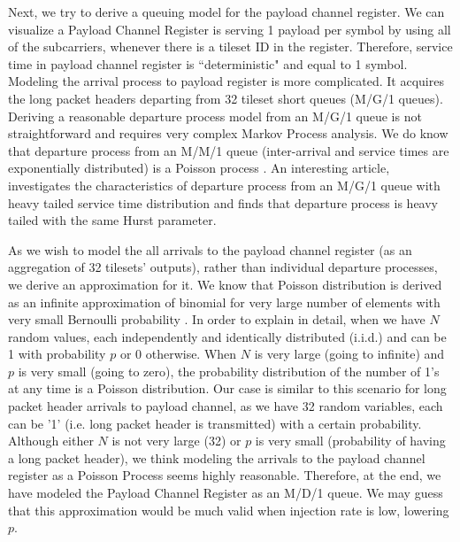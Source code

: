 Next, we try to derive a queuing model for the payload channel register. We can visualize a  Payload Channel Register is serving 1 payload per symbol by using all of the subcarriers, whenever there is a tileset ID in the register. Therefore, service time in payload channel register is ``deterministic" and equal to 1 symbol. Modeling the arrival process to payload register is more complicated. It acquires the long packet headers departing from 32 tileset short queues (M/G/1 queues). Deriving a reasonable departure process model from an M/G/1 queue is not straightforward and requires very complex Markov Process analysis. We do know that departure process from an M/M/1 queue (inter-arrival and service times are exponentially distributed) is a Poisson process \cite{burke1956output}. An interesting article, \cite{mokhtar2000characterization} investigates the characteristics of departure process from an M/G/1 queue with heavy tailed service time distribution and finds that departure process is heavy tailed with the same Hurst parameter. 

As we wish to model the all arrivals to the payload channel register (as an aggregation of 32 tilesets' outputs), rather than individual departure processes, we derive an approximation for it. We know that Poisson distribution is derived as an infinite approximation of binomial for very large number of elements with very small Bernoulli probability \cite{haight1967handbook}. In order to explain in detail, when we have $N$ random values, each independently and identically distributed (i.i.d.) and can be 1 with probability $p$ or 0 otherwise. When $N$ is very large (going to infinite) and $p$ is very small (going to zero), the probability distribution of the number of 1's at any time is a Poisson distribution. Our case is similar to this scenario for long packet header arrivals to payload channel, as we have 32 random variables, each can be '1' (i.e. long packet header is transmitted) with a certain probability. Although either $N$ is not very large (32) or $p$ is very small (probability of having a long packet header), we think modeling the arrivals to the payload channel register as a Poisson Process seems highly reasonable. Therefore, at the end, we have modeled the Payload Channel Register as an M/D/1 queue. We may guess that this approximation would be much valid when injection rate is low, lowering $p$.

